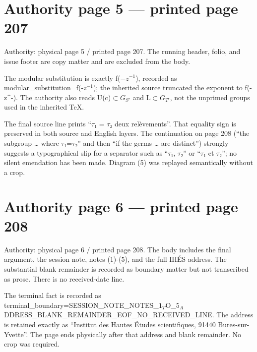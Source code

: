 \documentclass[10pt,a4paper]{article}
\begin{document}
\section*{Authority page 5 --- printed page 207}
\noindent Authority: physical page 5 / printed page 207. The running header, folio, and issue footer are copy matter and are excluded from the body.\par
\smallskip
\noindent The modular substitution is exactly f(\ensuremath{−}\ensuremath{z^{-1}}), recorded as modular\allowbreak\_substitution=f(-\ensuremath{z^{-1}}); the inherited source truncated the exponent to f(-z\textasciicircum{}-). The authority also reads U(c)\ensuremath{⊂}\ensuremath{G_{S′}} and L\ensuremath{⊂}\ensuremath{G_{T′}}, not the unprimed groups used in the inherited TeX.\par
\smallskip
\noindent The final source line prints “\ensuremath{τ₁} = \ensuremath{τ₂} deux relèvements”. That equality sign is preserved in both source and English layers. The continuation on page 208 (“the subgroup … where \ensuremath{τ₁}=\ensuremath{τ₂}” and then “if the germs … are distinct”) strongly suggests a typographical slip for a separator such as “\ensuremath{τ₁}, \ensuremath{τ₂}” or “\ensuremath{τ₁} et \ensuremath{τ₂}”; no silent emendation has been made. Diagram (5) was replayed semantically without a crop.\par
\clearpage
{}\hypertarget{authority-page-0006}{}
\section*{Authority page 6 --- printed page 208}
\noindent Authority: physical page 6 / printed page 208. The body includes the final argument, the session note, notes (1)-(5), and the full IHÉS address. The substantial blank remainder is recorded as boundary matter but not transcribed as prose. There is no received-date line.\par
\smallskip
\noindent The terminal fact is recorded as terminal\allowbreak\_boundary=SESSION\allowbreak\_NOTE\allowbreak\_NOTES\allowbreak\_\ensuremath{1_T}O\allowbreak\_\ensuremath{5_A}DDRESS\allowbreak\_BLANK\allowbreak\_REMAINDER\allowbreak\_EOF\allowbreak\_NO\allowbreak\_RECEIVED\allowbreak\_LINE. The address is retained exactly as “Institut des Hautes Études scientifiques, 91440 Bures-sur-Yvette”. The page ends physically after that address and blank remainder. No crop was required.\par
\end{document}
